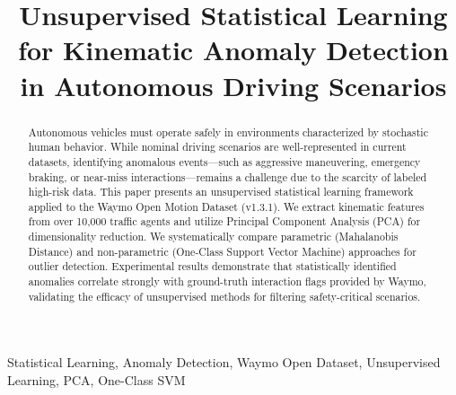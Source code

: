 \documentclass[conference]{IEEEtran}
\begin{document}
\title{Unsupervised Statistical Learning for Kinematic Anomaly Detection in Autonomous Driving Scenarios}

\author{
\and
{}
\and
{}
}

\maketitle

\begin{abstract}
Autonomous vehicles must operate safely in environments characterized by stochastic human behavior. While nominal driving scenarios are well-represented in current datasets, identifying anomalous events---such as aggressive maneuvering, emergency braking, or near-miss interactions---remains a challenge due to the scarcity of labeled high-risk data. This paper presents an unsupervised statistical learning framework applied to the Waymo Open Motion Dataset (v1.3.1). We extract kinematic features from over 10,000 traffic agents and utilize Principal Component Analysis (PCA) for dimensionality reduction. We systematically compare parametric (Mahalanobis Distance) and non-parametric (One-Class Support Vector Machine) approaches for outlier detection. Experimental results demonstrate that statistically identified anomalies correlate strongly with ground-truth interaction flags provided by Waymo, validating the efficacy of unsupervised methods for filtering safety-critical scenarios.
\end{abstract}

\begin{IEEEkeywords}
Statistical Learning, Anomaly Detection, Waymo Open Dataset, Unsupervised Learning, PCA, One-Class SVM
\end{IEEEkeywords}
\end{document}
